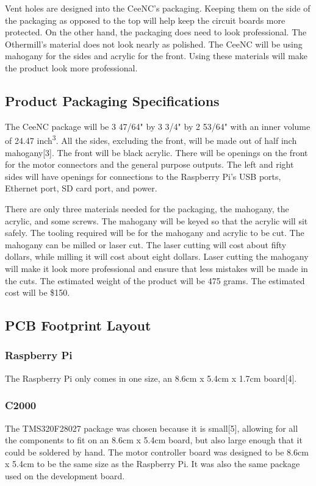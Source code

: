 Vent holes are designed into the CeeNC's packaging.
Keeping them on the side of the packaging as opposed to the top will help keep the circuit boards more protected.
On the other hand, the packaging does need to look professional.
The Othermill's material does not look nearly as polished.
The CeeNC will be using mahogany for the sides and acrylic for the front.
Using these materials will make the product look more professional.

\subsection{Product Packaging Specifications}

The CeeNC package will be 3 47/64" by 3 3/4" by 2 53/64" with an inner volume of 24.47 inch\textsuperscript{3}.
All the sides, excluding the front, will be made out of half inch mahogany[3].
The front will be black acrylic.
There will be openings on the front for the motor connectors and the general purpose outputs.
The left and right sides will have openings for connections to the Raspberry Pi's USB ports, Ethernet port, SD card port, and power. 

There are only three materials needed for the packaging, the mahogany, the acrylic, and some screws.
The mahogany will be keyed so that the acrylic will sit safely.
The tooling required will be for the mahogany and acrylic to be cut.
The mahogany can be milled or laser cut.
The laser cutting will cost about fifty dollars, while milling it will cost about eight dollars.
Laser cutting the mahogany will make it look more professional and ensure that less mistakes will be made in the cuts.
The estimated weight of the product will be 475 grams.
The estimated cost will be \$150.

\subsection{PCB Footprint Layout}


\subsubsection{Raspberry Pi}
The Raspberry Pi only comes in one size, an 8.6cm x 5.4cm x 1.7cm board[4].
\subsubsection{C2000}
The TMS320F28027 package was chosen because it is small[5], allowing for all the components to fit on an 8.6cm x 5.4cm board, but also large enough that it could be soldered by hand.
The motor controller board was designed to be 8.6cm x 5.4cm to be the same size as the Raspberry Pi. 
It was also the same package used on the development board.

